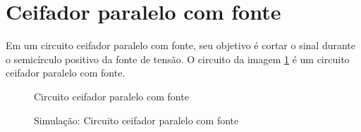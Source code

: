 \section{Ceifador paralelo com fonte}

Em um circuito ceifador paralelo com fonte, seu objetivo é cortar o sinal durante o semicírculo positivo da fonte de tensão. O circuito da imagem \ref{fig:ImagemSlide03} é um circuito ceifador paralelo com fonte.

\begin{figure}[H]
    \centering
    \caption{Circuito ceifador paralelo com fonte}
    \vspace{-0.3cm}
    \label{fig:ImagemSlide03}
\end{figure}

\begin{figure}[H]
    \centering
    \caption{Simulação: Circuito ceifador paralelo com fonte}
    \vspace{-0.3cm}
    \label{fig:SimulacaoCircuito03}
\end{figure}

